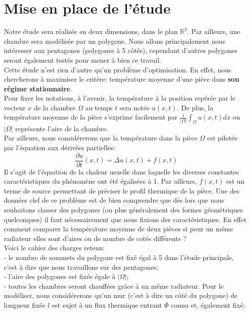 \documentclass[a4paper,reqno]{article}
\begin{document}
\part{Mise en place de l'étude}
Notre étude sera réalisée en deux dimensions, dans le plan $\mathbb{R}^2$. Par ailleurs, une chambre sera modélisée par un polygone. Nous allons principalement nous intéresser aux pentagones (polygones à 5 côtés), cependant d'autres polygones seront également testés pour mener à bien ce travail. \\
Cette étude n'est rien d'autre qu'un problème d'optimisation. En effet, nous chercherons à maximiser le critère: température moyenne d'une pièce dans \textbf{son régime stationnaire}. \\ Pour fixer les notations, à l'avenir, la température à la position repérée par le vecteur $x$ de la chambre $\Omega$ au temps $t$ sera notée $u(x,t)$. De plus, la température moyenne de la pièce s'exprime facilement par  $ \frac {1}{|\Omega|}\int_{\Omega} u(x,t) dx $ ou $|\Omega|$ représente l'aire de la chambre.\\
Par ailleurs, nous considérerons que la température dans la pièce $\Omega$ est pilotée par l'équation aux dérivées partielles: 
\\
\begin{equation}
\frac{\partial u}{\partial t}(x,t) = \Delta u(x,t) + f(x,t)
\end{equation}
Il s'agit de l'équation de la chaleur usuelle dans laquelle les diverses constantes caractéristiques du phénomène ont été égalisées à 1. Par ailleurs, $f(x,t)$ est un terme de source permettant de préciser le profil thermique de la pièce.
Une des données clef de ce problème est de bien comprendre que dés lors que nous souhaitons classer des polygones (ou plus généralement des formes géométriques quelconques) il faut nécessairement que nous fixions des caractéristiques. En effet comment comparer la température moyenne de deux pièces si pour un même radiateur elles sont d'aires ou de nombre de cotés différents ? \\
Voici le cahier des charges retenu: \\
- le nombre de sommets du polygone est fixé égal à 5 dans l'étude principale, c'est à dire que nous travaillons sur des pentagones; \\
- l'aire des polygones est fixée égale à $|\Omega|$; \\
- toutes les chambres seront chauffées grâce à un même radiateur. Pour le modéliser, nous considérerons qu'un mur (c'est à dire un côté du polygone) de longueur fixée $l$ est sujet à un flux thermique entrant $\Phi$ connu et, également fixé;  \\
\end{document}
